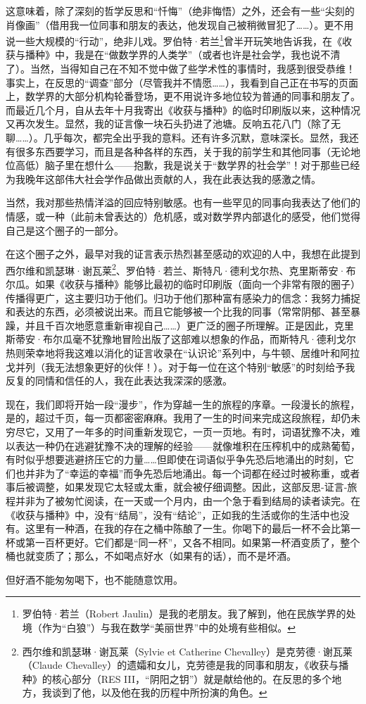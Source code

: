 这意味着，除了深刻的哲学反思和“忏悔”（绝非悔悟）之外，还会有一些“尖刻的肖像画”（借用我一位同事和朋友的表达，他发现自己被稍微冒犯了……）。更不用说一些大规模的“行动”，绝非儿戏。罗伯特·若兰\footnote{罗伯特·若兰（Robert Jaulin）是我的老朋友。我了解到，他在民族学界的处境（作为“白狼”）与我在数学“美丽世界”中的处境有些相似。}曾半开玩笑地告诉我，在《收获与播种》中，我是在“做数学界的人类学”（或者也许是社会学，我也说不清了）。当然，当得知自己在不知不觉中做了些学术性的事情时，我感到很受恭维！事实上，在反思的“调查”部分（尽管我并不情愿……），我看到自己正在书写的页面上，数学界的大部分机构轮番登场，更不用说许多地位较为普通的同事和朋友了。而最近几个月，自从去年十月我寄出《收获与播种》的临时印刷版以来，这种情况又再次发生。显然，我的证言像一块石头扔进了池塘。反响五花八门（除了无聊……）。几乎每次，都完全出乎我的意料。还有许多沉默，意味深长。显然，我还有很多东西要学习，而且是各种各样的东西，关于我的前学生和其他同事（无论地位高低）脑子里在想什么——抱歉，我是说关于“数学界的社会学”！对于那些已经为我晚年这部伟大社会学作品做出贡献的人，我在此表达我的感激之情。

当然，我对那些热情洋溢的回应特别敏感。也有一些罕见的同事向我表达了他们的情感，或一种（此前未曾表达的）危机感，或对数学界内部退化的感受，他们觉得自己是这个圈子的一部分。

在这个圈子之外，最早对我的证言表示热烈甚至感动的欢迎的人中，我想在此提到西尔维和凯瑟琳·谢瓦莱\footnote{西尔维和凯瑟琳·谢瓦莱（Sylvie et Catherine Chevalley）是克劳德·谢瓦莱（Claude Chevalley）的遗孀和女儿，克劳德是我的同事和朋友，《收获与播种》的核心部分（RES III，“阴阳之钥”）就是献给他的。在反思的多个地方，我谈到了他，以及他在我的历程中所扮演的角色。}、罗伯特·若兰、斯特凡·德利戈尔热、克里斯蒂安·布尔瓜。如果《收获与播种》能够比最初的临时印刷版（面向一个非常有限的圈子）传播得更广，这主要归功于他们。归功于他们那种富有感染力的信念：我努力捕捉和表达的东西，必须被说出来。而且它能够被一个比我的同事（常常阴郁、甚至暴躁，并且千百次地愿意重新审视自己……）更广泛的圈子所理解。正是因此，克里斯蒂安·布尔瓜毫不犹豫地冒险出版了这部难以想象的作品，而斯特凡·德利戈尔热则荣幸地将我这难以消化的证言收录在“认识论”系列中，与牛顿、居维叶和阿拉戈并列（我无法想象更好的伙伴！）。对于每一位在这个特别“敏感”的时刻给予我反复的同情和信任的人，我在此表达我深深的感激。

现在，我们即将开始一段“漫步”，作为穿越一生的旅程的序章。一段漫长的旅程，是的，超过千页，每一页都密密麻麻。我用了一生的时间来完成这段旅程，却仍未穷尽它，又用了一年多的时间重新发现它，一页一页地。有时，词语犹豫不决，难以表达一种仍在逃避犹豫不决的理解的经验——就像堆积在压榨机中的成熟葡萄，有时似乎想要逃避挤压它的力量……但即使在词语似乎争先恐后地涌出的时刻，它们也并非为了“幸运的幸福”而争先恐后地涌出。每一个词都在经过时被称重，或者事后被调整，如果发现它太轻或太重，就会被仔细调整。因此，这部反思-证言-旅程并非为了被匆忙阅读，在一天或一个月内，由一个急于看到结局的读者读完。在《收获与播种》中，没有“结局”，没有“结论”，正如我的生活或你的生活中也没有。这里有一种酒，在我的存在之桶中陈酿了一生。你喝下的最后一杯不会比第一杯或第一百杯更好。它们都是“同一杯”，又各不相同。如果第一杯酒变质了，整个桶也就变质了；那么，不如喝点好水（如果有的话），而不是坏酒。

但好酒不能匆匆喝下，也不能随意饮用。

